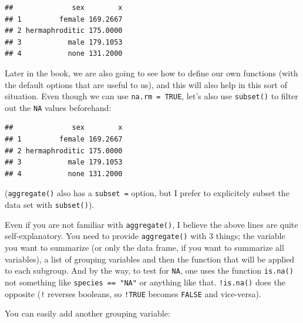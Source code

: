 \documentclass[
]{article}
\newenvironment{Shaded}{\begin{snugshade}}{\end{snugshade}}
\newcommand{\AttributeTok}[1]{\textcolor[rgb]{0.77,0.63,0.00}{#1}}
\newcommand{\FunctionTok}[1]{\textcolor[rgb]{0.00,0.00,0.00}{#1}}
\newcommand{\NormalTok}[1]{#1}
\newcommand{\OtherTok}[1]{\textcolor[rgb]{0.56,0.35,0.01}{#1}}
\newcommand{\SpecialCharTok}[1]{\textcolor[rgb]{0.00,0.00,0.00}{#1}}
\begin{document}
\begin{verbatim}
##              sex        x
## 1         female 169.2667
## 2 hermaphroditic 175.0000
## 3           male 179.1053
## 4           none 131.2000
\end{verbatim}

Later in the book, we are also going to see how to define our own functions (with the default options that
are useful to us), and this will also help in this sort of situation.
Even though we can use \texttt{na.rm\ =\ TRUE}, let's also use \texttt{subset()} to filter out the \texttt{NA} values beforehand:

\begin{Shaded}
\end{Shaded}

\begin{verbatim}
##              sex        x
## 1         female 169.2667
## 2 hermaphroditic 175.0000
## 3           male 179.1053
## 4           none 131.2000
\end{verbatim}

(\texttt{aggregate()} also has a \texttt{subset\ =} option, but I prefer to explicitely subset the data set with \texttt{subset()}).

Even if you are not familiar with \texttt{aggregate()}, I believe the above lines are quite
self-explanatory. You need to provide \texttt{aggregate()} with 3 things; the variable you want to
summarize (or only the data frame, if you want to summarize all variables), a list of grouping
variables and then the function that will be applied to each subgroup. And by the way, to test for
\texttt{NA}, one uses the function \texttt{is.na()} not something like \texttt{species\ ==\ "NA"} or anything like that.
\texttt{!is.na()} does the opposite (\texttt{!} reverses booleans, so \texttt{!TRUE} becomes \texttt{FALSE} and vice-versa).

You can easily add another grouping variable:
\end{document}
